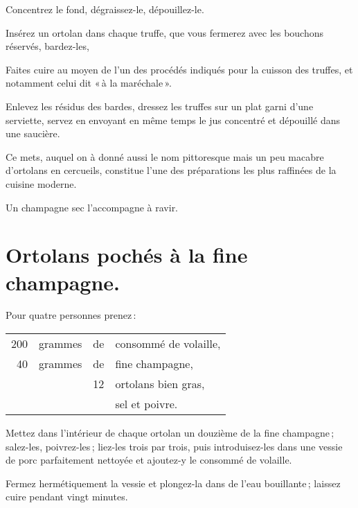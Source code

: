 Concentrez le fond, dégraissez-le, dépouillez-le.

Insérez un ortolan dans chaque truffe, que vous fermerez avec les bouchons
réservés, bardez-les,

Faites cuire au moyen de l'un des procédés indiqués pour la cuisson des truffes,
et notamment celui dit « à la maréchale ».

Enlevez les résidus des bardes, dressez les truffes sur un plat garni d'une
serviette, servez en envoyant en même temps le jus concentré et dépouillé dans
une saucière.

Ce mets, auquel on à donné aussi le nom pittoresque mais un peu macabre
d'ortolans en cercueils, constitue l'une des préparations les plus raffinées de
la cuisine moderne.

Un champagne sec l'accompagne à ravir.

\section*{\centering Ortolans pochés à la fine champagne.}
{}

Pour quatre personnes prenez :

\medskip

\footnotesize
\begin{longtable}{rrrp{16em}}
    200 & grammes & de & consommé de volaille,                                                            \\
     40 & grammes & de & fine champagne,                                                                  \\
        &         & 12 & ortolans bien gras,                                                              \\
        &         &    & sel et poivre.                                                                   \\
\end{longtable}
\normalsize

Mettez dans l'intérieur de chaque ortolan un douzième de la fine champagne ;
salez-les, poivrez-les ; liez-les trois par trois, puis introduisez-les dans
une vessie de porc parfaitement nettoyée et ajoutez-y le consommé de volaille.

Fermez hermétiquement la vessie et plongez-la dans de l'eau bouillante ;
laissez cuire pendant vingt minutes.

